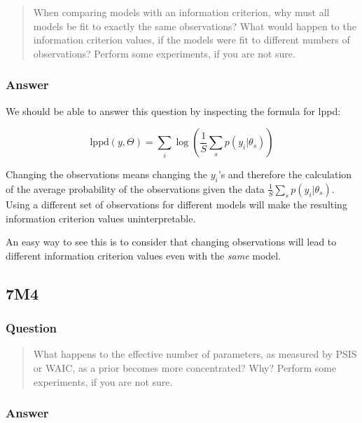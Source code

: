 \documentclass[
]{book}
\begin{document}
\begin{quote}
When comparing models with an information criterion, why must all models be fit to exactly the same observations? What would happen to the information criterion values, if the models were fit to different numbers of observations? Perform some experiments, if you are not sure.
\end{quote}

\hypertarget{answer-66}{%
\subsubsection*{Answer}\label{answer-66}}

We should be able to answer this question by inspecting the formula for lppd:

\[
\text{lppd}(y,\Theta) = \sum_i \log \left( \frac{1}{S}\sum_s p(y_i | \theta_s) \right)
\]

Changing the observations means changing the \(y_i\)'s and therefore the calculation of the average probability of the observations given the data \(\frac{1}{S}\sum_s p(y_i | \theta_s)\). Using a different set of observations for different models will make the resulting information criterion values uninterpretable.

An easy way to see this is to consider that changing observations will lead to different information criterion values even with the \emph{same} model.

\hypertarget{m4-3}{%
\subsection*{7M4}\label{m4-3}}

\hypertarget{question-67}{%
\subsubsection*{Question}\label{question-67}}

\begin{quote}
What happens to the effective number of parameters, as measured by PSIS or WAIC, as a prior becomes more concentrated? Why? Perform some experiments, if you are not sure.
\end{quote}

\hypertarget{answer-67}{%
\subsubsection*{Answer}\label{answer-67}}
\end{document}
